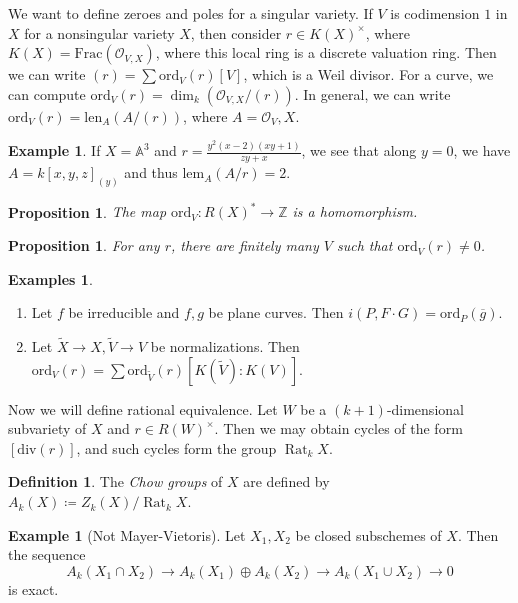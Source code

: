 \documentclass[leqno, openany]{memoir}
\newtheorem{prop}[thm]{Proposition}
\theoremstyle{definition}
\newtheorem{defn}[thm]{Definition}
\newtheorem{exm}[thm]{Example}
\newtheorem{exms}[thm]{Examples}
\theoremstyle{remark}
\theoremstyle{plain}
\theoremstyle{definition}
\theoremstyle{remark}
\newcommand{\A}{\mathbb{A}}
\newcommand{\Z}{\mathbb{Z}}
\newcommand{\mc}[1]{\mathcal{#1}}
\newcommand{\mr}[1]{\mathrm{#1}}
\newcommand{\ol}[1]{\overline{#1}}
\newcommand{\wt}[1]{\widetilde{#1}}
\begin{document}
We want to define zeroes and poles for a singular variety. If $V$ is codimension $1$ in $X$ for a nonsingular variety $X$, then consider $r \in {K(X)}^{\times}$, where $K(X) = \mr{Frac}(\mc{O}_{V,X})$, where this local ring is a discrete valuation ring. Then we can write $(r) = \sum \mr{ord}_V(r) [V]$, which is a Weil divisor. For a curve, we can compute $\mr{ord}_V(r) = \dim_k (\mc{O}_{V,X} / (r))$. In general, we can write $\mr{ord}_V(r) = \mr{len}_A(A/(r))$, where $A = \mc{O}_V,X$.

\begin{exm}
    If $X = \A^3$ and $r = \frac{y^2(x-2)(xy+1)}{zy+x}$, we see that along $y = 0$, we have $A = { k[x,y,z] }_{(y)}$ and thus $\mr{lem}_A(A/r) = 2$.
\end{exm}

\begin{prop}
    The map $\mr{ord}_V \colon R(X)^* \to \Z$ is a homomorphism.
\end{prop}

\begin{prop}
    For any $r$, there are finitely many $V$ such that $\mr{ord}_V(r) \neq 0$.
\end{prop}

\begin{exms}\leavevmode
    \begin{enumerate}
        \item Let $f$ be irreducible and $f,g$ be plane curves. Then $i(P, F \cdot G) = \mr{ord}_P(\ol{g})$.
        \item Let $\wt{X} \to X, \wt{V} \to V$ be normalizations. Then $\mr{ord}_V(r) = \sum \mr{ord}_{\wt{V}}(r) [K(\wt{V}) : K(V)]$.
    \end{enumerate}
\end{exms}

Now we will define rational equivalence. Let $W$ be a $(k+1)$-dimensional subvariety of $X$ and $r \in { R(W) }^{\times}$. Then we may obtain cycles of the form $[\mr{div}(r)]$, and such cycles form the group $\operatorname{Rat}_k X$.

\begin{defn}
    The \textit{Chow groups} of $X$ are defined by $A_k(X) \coloneqq Z_k(X) / \operatorname{Rat}_k X$. 
\end{defn}

\begin{exm}[Not Mayer-Vietoris]
    Let $X_1, X_2$ be closed subschemes of $X$. Then the sequence
    \[ A_k(X_1 \cap X_2) \to A_k(X_1) \oplus A_k(X_2) \to A_k(X_1 \cup X_2) \to 0 \]
    is exact.
\end{exm}
\end{document}
